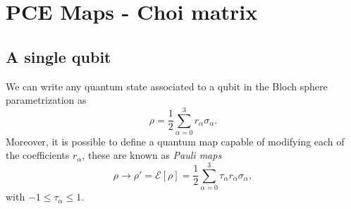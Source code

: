 \section{PCE Maps - Choi matrix}
% 
\subsection{A single qubit}

We can write any quantum state associated to a qubit in the Bloch sphere parametrization as
% 
\begin{equation}
\rho=\frac{1}{2}\sum_{\alpha=0}^{3} r_{\alpha} \sigma_{\alpha}.
\label{rho2}
\end{equation}
% 
Moreover, it is possible to define a quantum map capable of modifying each of the coefficients $r_{\alpha}$, these are known as \textit{Pauli maps}
% 
\begin{equation}
\rho \to \rho'=\mathcal{E}[\rho ]=\frac{1}{2}\sum_{\alpha=0}^{3} \tau_{\alpha} r_{\alpha} \sigma_{\alpha},
\label{Pauli_Map}
\end{equation}
% 
with $-1\leq \tau_{\alpha} \leq 1$. 


